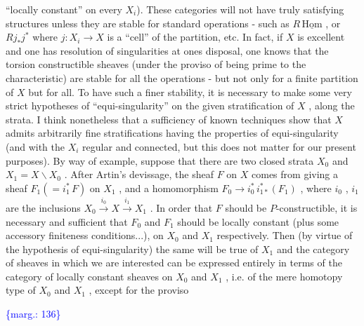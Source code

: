 \documentclass[11pt]{article}
\newcommand{\scanpage}[1]{\par\bigskip\noindent{\small\sffamily[scan #1]}\par}
\newcommand{\mspage}[1]{{\small\sffamily[p.\,#1]}}
\newcommand{\margin}[1]{\textcolor{blue}{\{\textsf{marg.:} #1\}}}
\begin{document}
``locally constant'' on every $X_i$). These categories will not have
truly satisfying structures unless they are stable for standard
operations - such as $R\,\underline{\mathrm{Hom}}$ , or $Rj_*j^*$ where $j : X_i \to X$ is
a ``cell'' of the partition, etc. In fact, if $X$ is excellent and
one has resolution of singularities at ones disposal, one
knows that the torsion constructible sheaves (under the proviso
of being prime to the characteristic) are stable for all the
operations - but not only for a finite partition of $X$ but for
all. To have such a finer stability, it is necessary to make
some very strict hypotheses of ``equi-singularity'' on the given
stratification of $X$ , along the strata. I think nonetheless that
a sufficiency of known techniques show that $X$ admits arbitrarily
fine stratifications having the properties of equi-singularity
(and with the $X_i$ regular and connected, but this does not matter
for our present purposes). By way of example, suppose that there
are two closed strata $X_0$ and $X_1 = X\backslash X_0$ . After Artin's
devissage, the sheaf $F$ on $X$ comes from giving a sheaf
$F_1(= i_1^*\,F)$ on $X_1$ , and a homomorphism $F_0 \to i_0^*\,i_{1*}^*(F_1)$ , where
$i_0$ , $i_1$ are the inclusions $X_0 \xrightarrow{i_0} X \xrightarrow{i_1} X_1$ .
In order that $F$ should be $P$-constructible, it is necessary and
sufficient that $F_0$ and $F_1$ should be locally constant (plus
some accessory finiteness conditions...), on $X_0$ and $X_1$
respectively. Then (by virtue of the hypothesis of equi-singularity)
the same will be true of $X_1$ and the category of sheaves in which
we are interested can be expressed entirely in terms of the
category of locally constant sheaves on $X_0$ and $X_1$ , i.e. of
the mere homotopy type of $X_0$ and $X_1$ , except for the proviso

\margin{136}

\clearpage
\scanpage{134-2/136}
\mspage{- 9 -}
\end{document}
